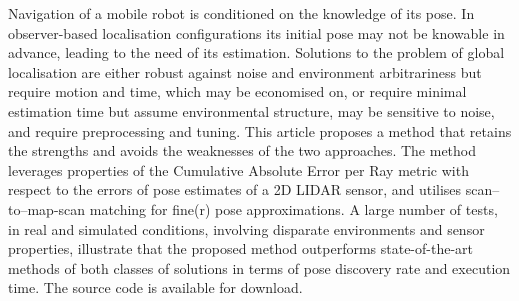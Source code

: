Navigation of a mobile robot is conditioned on the knowledge of its pose. In
observer-based localisation configurations its initial pose may not be knowable
in advance, leading to the need of its estimation. Solutions to the problem of
global localisation are either robust against noise and environment
arbitrariness but require motion and time, which may be economised on, or
require minimal estimation time but assume environmental structure, may be
sensitive to noise, and require preprocessing and tuning. This article proposes
a method that retains the strengths and avoids the weaknesses of the two
approaches. The method leverages properties of the Cumulative Absolute Error
per Ray metric with respect to the errors of pose estimates of a 2D LIDAR
sensor, and utilises scan--to--map-scan matching for fine(r) pose
approximations.  A large number of tests, in real and simulated conditions,
involving disparate environments and sensor properties, illustrate that the
proposed method outperforms state-of-the-art methods of both classes of
solutions in terms of pose discovery rate and execution time. The source code
is available for download.
